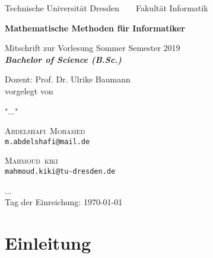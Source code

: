 \documentclass[a4paper,12pt]{report}
\makeatletter
\newcommand{\nameE}{Mohamed}
\newcommand{\vornameE}{Abdelshafi}
\newcommand{\emailE}{m.abdelshafi@mail.de}
\newcommand{\nameS}{kiki}
\newcommand{\vornameS}{Mahmoud}
\newcommand{\emailS}{mahmoud.kiki@tu-dresden.de}
\theoremstyle{plain} %
\theoremstyle{break}
\newcommand{\thema}{Mathematische Methoden für Informatiker}
\newcommand{\datum}{\today}%
\makeatother
\begin{document}




	\thispagestyle{empty}


    \begin{center}
    {\Large
    Technische Universit\"{a}t Dresden\  \ \textbullet\ \ Fakult\"{a}t Informatik
    }

        \vfil

        {\bfseries\Huge\thema}

        \vfil

        {\LARGE
Mitschrift zur Vorlesung Sommer Semester 2019  \\[\bigskipamount]

        \bfseries{\itshape Bachelor of Science  \textup{(}B.Sc.\textup{)}}\\[\bigskipamount]
        }%

        \vfil\vfil\vfil
        Dozent: Prof. Dr. Ulrike Baumann \\
        vorgelegt von\\
        \item "..." \\
        \item \textsc{\vornameE\ \nameE } \\ \texttt{\emailE} \\  \item
        \textsc{\vornameS\ \nameS \qquad } \\ \texttt{\emailS}  \\
        \item ... \\
        Tag der Einreichung: \datum\\[\bigskipamount]

    \end{center}


    \cleardoublepage



    \tableofcontents

    \thispagestyle{empty}



    \setcounter{page}{0}
    \chapter*{Einleitung}



\listoftheorems[ ignoreall,show={definition}]
\listoftheorems[ignoreall,show={example}]
 
\end{document}

